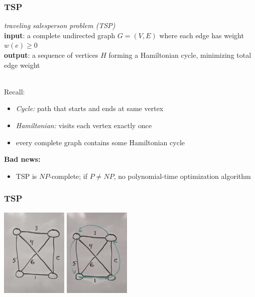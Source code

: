 \documentclass[10pt,aspectratio=169]{beamer}
\newcommand{\stanza}{ \\~\ }
\begin{document}
\begin{frame} \frametitle{TSP}
  \emph{traveling salesperson problem (TSP)} \\
  \textbf{input}: a complete undirected graph $G=(V,E)$ where each edge has weight $w(e) \geq 0$ \\
  \textbf{output}: a sequence of vertices $H$ forming a Hamiltonian cycle, minimizing
  total edge weight
  \stanza
  
  Recall:
  \begin{itemize}
    \item \emph{Cycle:} path that starts and ends at same vertex
    \item \emph{Hamiltonian:} visits each vertex exactly once
    \item every complete graph contains some Hamiltonian cycle
  \end{itemize}
  
  \textbf{Bad news:}
  \begin{itemize}
    \item TSP is $NP$-complete; if $P \ne NP$, no polynomial-time optimization algorithm
  \end{itemize}
  \end{frame}
  
  \begin{frame} \frametitle{TSP}
    \begin{center}
      \includegraphics[height=120pt]{13-tsp-input.jpg}
      \includegraphics[height=120pt]{13-tsp-output.jpg}
    \end{center}
  \end{frame}
  
\end{document}

